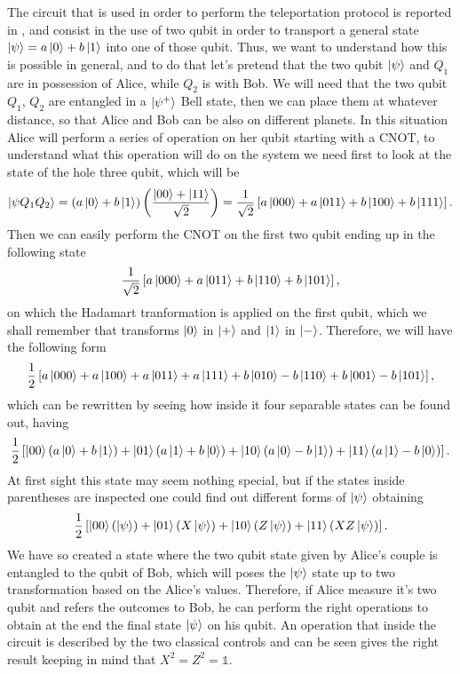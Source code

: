 The circuit that is used in order to perform the teleportation protocol is reported in , and consist in the use of two qubit in order to transport a general state $\ket{\psi} = a\ket{0} + b\ket{1}$ into one of those qubit. Thus, we want to understand how this is possible in general, and to do that let's pretend that the two qubit $\ket{\psi}$ and $Q_1$ are in possession of Alice, while $Q_2$ is with Bob. We will need that the two qubit $Q_1$, $Q_2$ are entangled in a $\ket{\psi^+}$ Bell state, then we can place them at whatever distance, so that Alice and Bob can be also on different planets. In this situation Alice will perform a series of operation on her qubit starting with a CNOT, to understand what this operation will do on the system we need first to look at the state of the hole three qubit, which will be
\begin{equation}
    \ket{\psi Q_1Q_2} = \left( a\ket{0} + b\ket{1} \right)\left( \frac{\ket{00} + \ket{11}}{\sqrt{2}} \right) = \frac{1}{\sqrt{2}}\left[ a\ket{000} + a\ket{011} + b\ket{100} + b\ket{111} \right].
\end{equation}
Then we can easily perform the CNOT on the first two qubit ending up in the following state
\begin{equation}
    \frac{1}{\sqrt{2}}\left[ a\ket{000} + a\ket{011} + b\ket{110} + b\ket{101} \right],
\end{equation}
on which the Hadamart tranformation is applied on the first qubit, which we shall remember that transforms $\ket{0}$ in $\ket{+}$ and $\ket{1}$ in $\ket{-}$. Therefore, we will have the following form
\begin{equation}
    \frac{1}{2}\left[ a\ket{000} + a\ket{100} + a\ket{011} + a\ket{111} + b\ket{010} - b\ket{110} + b\ket{001} - b\ket{101} \right],
\end{equation}
which can be rewritten by seeing how inside it four separable states can be found out, having
\begin{equation}
    \frac{1}{2}\left[ \ket{00}\left( a\ket{0} + b\ket{1} \right) + \ket{01}\left( a\ket{1} + b\ket{0} \right) + \ket{10}\left( a\ket{0} - b\ket{1} \right) + \ket{11}\left( a\ket{1} - b\ket{0} \right) \right].
\end{equation}
At first sight this state may seem nothing special, but if the states inside parentheses are inspected one could find out different forms of $\ket{\psi}$ obtaining
\begin{equation}
    \frac{1}{2}\left[ \ket{00}\left( \ket{\psi} \right) + \ket{01}\left( X\ket{\psi} \right) + \ket{10}\left( Z\ket{\psi} \right) + \ket{11}\left( XZ\ket{\psi} \right) \right].
\end{equation}
We have so created a state where the two qubit state given by Alice's couple is entangled to the qubit of Bob, which will poses the $\ket{\psi}$ state up to two transformation based on the Alice's values. Therefore, if Alice measure it's two qubit and refers the outcomes to Bob, he can perform the right operations to obtain at the end the final state $\ket{\psi}$ on his qubit. An operation that inside the circuit is described by the two classical controls and can be seen gives the right result keeping in mind that $X^2 = Z^2 = \mathbb{1}$.

